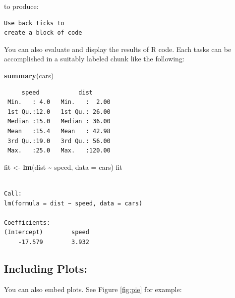 \documentclass[
]{book}
\newenvironment{Shaded}{\begin{snugshade}}{\end{snugshade}}
\newcommand{\AttributeTok}[1]{\textcolor[rgb]{0.13,0.29,0.53}{#1}}
\newcommand{\FunctionTok}[1]{\textcolor[rgb]{0.13,0.29,0.53}{\textbf{#1}}}
\newcommand{\NormalTok}[1]{#1}
\newcommand{\OtherTok}[1]{\textcolor[rgb]{0.56,0.35,0.01}{#1}}
\newcommand{\SpecialCharTok}[1]{\textcolor[rgb]{0.81,0.36,0.00}{\textbf{#1}}}
\begin{document}
to produce:

\begin{verbatim}
Use back ticks to 
create a block of code
\end{verbatim}

You can also evaluate and display the results of R code. Each tasks can be accomplished in a suitably labeled chunk like the following:

\begin{Shaded}
\begin{Highlighting}[]
\FunctionTok{summary}\NormalTok{(cars)}
\end{Highlighting}
\end{Shaded}

\begin{verbatim}
     speed           dist       
 Min.   : 4.0   Min.   :  2.00  
 1st Qu.:12.0   1st Qu.: 26.00  
 Median :15.0   Median : 36.00  
 Mean   :15.4   Mean   : 42.98  
 3rd Qu.:19.0   3rd Qu.: 56.00  
 Max.   :25.0   Max.   :120.00  
\end{verbatim}

\begin{Shaded}
\begin{Highlighting}[]
\NormalTok{fit }\OtherTok{\textless{}{-}} \FunctionTok{lm}\NormalTok{(dist }\SpecialCharTok{\textasciitilde{}}\NormalTok{ speed, }\AttributeTok{data =}\NormalTok{ cars)}
\NormalTok{fit}
\end{Highlighting}
\end{Shaded}

\begin{verbatim}

Call:
lm(formula = dist ~ speed, data = cars)

Coefficients:
(Intercept)        speed  
    -17.579        3.932  
\end{verbatim}

\hypertarget{including-plots}{%
\subsection{Including Plots:}\label{including-plots}}

You can also embed plots. See Figure \ref{fig:pie} for example:
\end{document}
